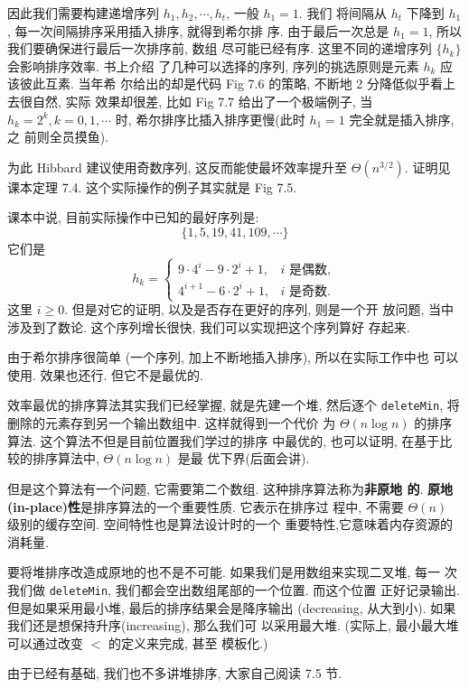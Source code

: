\documentclass[a4paper]{ctexart}
\theoremstyle{definition}
\theoremstyle{definition}
\begin{document}
因此我们需要构建递增序列 $h_1, h_2, \cdots, h_t$, 一般 $h_1 = 1$. 我们
将间隔从 $h_t$ 下降到 $h_1$, 每一次间隔排序采用插入排序, 就得到希尔排
序. 由于最后一次总是 $h_1 = 1$, 所以我们要确保进行最后一次排序前, 数组
尽可能已经有序. 这里不同的递增序列 $\{h_k\}$ 会影响排序效率. 书上介绍
了几种可以选择的序列, 序列的挑选原则是元素 $h_k$ 应该彼此互素. 当年希
尔给出的却是代码 Fig 7.6 的策略, 不断地 2 分降低似乎看上去很自然, 实际
效果却很差, 比如 Fig 7.7 给出了一个极端例子, 当 $h_k = 2^k, k = 0, 1,
\cdots$ 时, 希尔排序比插入排序更慢(此时 $h_1 = 1$ 完全就是插入排序, 之
前则全员摸鱼).

为此 Hibbard 建议使用奇数序列, 这反而能使最坏效率提升至 $\Theta(n^{3 /
  2})$. 证明见课本定理 7.4. 这个实际操作的例子其实就是 Fig 7.5.

课本中说, 目前实际操作中已知的最好序列是:
$$
\{1, 5, 19, 41, 109, \cdots\}
$$
它们是
$$
h_k = \left\{
\begin{array}{ll}
  9 \cdot 4^i - 9 \cdot 2^i + 1, & \mbox{$i$ 是偶数},\\
  4^{i + 1} - 6 \cdot 2^i + 1, & \mbox{$i$ 是奇数}.
\end{array}
\right.
$$
这里 $i \geq 0$. 但是对它的证明, 以及是否存在更好的序列, 则是一个开
放问题, 当中涉及到了数论. 这个序列增长很快, 我们可以实现把这个序列算好
存起来.

由于希尔排序很简单 (一个序列, 加上不断地插入排序), 所以在实际工作中也
可以使用. 效果也还行. 但它不是最优的.


效率最优的排序算法其实我们已经掌握, 就是先建一个堆, 然后逐个
\verb|deleteMin|, 将删除的元素存到另一个输出数组中. 这样就得到一个代价
为 $\Theta(n \log n)$ 的排序算法. 这个算法不但是目前位置我们学过的排序
中最优的, 也可以证明, 在基于比较的排序算法中, $\Theta(n \log n)$ 是最
优下界(后面会讲).

但是这个算法有一个问题, 它需要第二个数组. 这种排序算法称为{\bf 非原地
  的}. {\bf 原地(in-place)性}是排序算法的一个重要性质. 它表示在排序过
程中, 不需要 $\Theta(n)$ 级别的缓存空间. 空间特性也是算法设计时的一个
重要特性,它意味着内存资源的消耗量.

要将堆排序改造成原地的也不是不可能. 如果我们是用数组来实现二叉堆, 每一
次我们做 \verb|deleteMin|, 我们都会空出数组尾部的一个位置. 而这个位置
正好记录输出. 但是如果采用最小堆, 最后的排序结果会是降序输出
(decreasing, 从大到小). 如果我们还是想保持升序(increasing), 那么我们可
以采用最大堆.  (实际上, 最小最大堆可以通过改变 $<$ 的定义来完成, 甚至
模板化.)

由于已经有基础, 我们也不多讲堆排序, 大家自己阅读 7.5 节.
\end{document}
